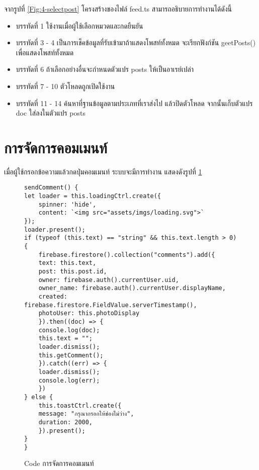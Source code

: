 จากรูปที่ \ref{Fig:4-selectpost} โครงสร้างของไฟล์ feed.ts สามารถอธิบายการทำงานได้ดังนี้
\begin{itemize}[label={--}]
\item บรรทัดที่ 1 ใช้งานเมื่อผู้ใช้เลือกหมวดและกดยืนยัน
\item บรรทัดที่ 3 - 4 เป็นการเช็คข้อมูลที่รับเข้ามาถ้าแสดงโพสท์ทั้งหมด จะเรียกฟังก์ชัน geetPosts() เพื่อแสดงโพสท์ทั้งหมด
\item บรรทัดที่ 6 ถ้าเลือกอย่างอื่นจะกำหนดตัวแปร posts ให้เป็นอาเรย์เปล่า
\item บรรทัดที่ 7 - 10 ตัวโหลดถูกเปิดใช้งาน
\item บรรทัดที่ 11 - 14 ค้นหาที่ฐานข้อมูลตามประเภทที่เราส่งไป แล้วปิดตัวโหลด จากนั้นเก็บตัวแปร doc ใส่ลงในตัวแปร posts
\end{itemize}
\newpage



\section{การจัดการคอมเมนท์}
เมื่อผู้ใช้กรอกข้อความแล้วกดปุ่มคอมเมนท์ ระบบจะมีการทำงาน แสดงดังรูปที่ \ref{Fig:4-commentspost}

\begin{figure}[H]
{\lstset{language=Pascal}
\begin{lstlisting}
sendComment() {
let loader = this.loadingCtrl.create({
	spinner: 'hide',
	content: `<img src="assets/imgs/loading.svg">`
});
loader.present();
if (typeof (this.text) == "string" && this.text.length > 0) {
	firebase.firestore().collection("comments").add({
	text: this.text,
	post: this.post.id,
	owner: firebase.auth().currentUser.uid,
	owner_name: firebase.auth().currentUser.displayName,
	created: firebase.firestore.FieldValue.serverTimestamp(),
	photoUser: this.photoDisplay
	}).then((doc) => {
	console.log(doc);
	this.text = "";
	loader.dismiss();
	this.getComment();
	}).catch((err) => {
	loader.dismiss();
	console.log(err);
	})
} else {
	this.toastCtrl.create({
	message: "กรุณากรอกให้ช่องไม่ว่าง",
	duration: 2000,
	}).present();
}
}
\end{lstlisting}}
\caption{Code การจัดการคอมเมนท์}
\label{Fig:4-commentspost}
\end{figure}
\newpage

